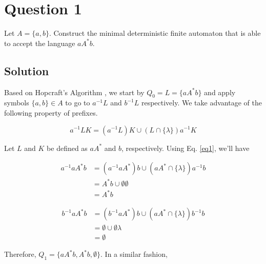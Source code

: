 
\section*{Question 1}

Let $A = \{a,b\}$.
Construct the minimal deterministic finite automaton that is able to accept the language $aA^*b$.

\subsection*{Solution}

Based on Hopcraft's Algorithm \cite{hopcroft1971n}, we start by $Q_0 = L = \{aA^*b\}$ and apply symbols $\{a,b\}\in A$ to go to $a^{-1}L$ and $b^{-1}L$ respectively.
We take advantage of the following property of prefixes.

\begin{equation}\label{eq1}
a^{-1}LK = (a^{-1}L)K \cup (L \cap \{\lambda\})a^{-1}K
\end{equation}

Let $L$ and $K$ be defined as $aA^*$ and $b$, respectively.
Using Eq. \ref{eq1}, we'll have

\begin{equation}\label{eq2}
\begin{aligned}
a^{-1}aA^*b &= (a^{-1}aA^*)b \cup (aA^* \cap \{\lambda\})a^{-1}b\\
&= A^*b \cup \emptyset \emptyset\\
&= A^*b
\end{aligned}
\end{equation}

\begin{equation}\label{eq3}
\begin{aligned}
b^{-1}aA^*b &= (b^{-1}aA^*)b \cup (aA^* \cap \{\lambda\})b^{-1}b\\
&= \emptyset \cup \emptyset \lambda\\
&= \emptyset
\end{aligned}
\end{equation}

Therefore, $Q_1 = \{aA^*b, A^*b, \emptyset\}$.
In a similar fashion,

